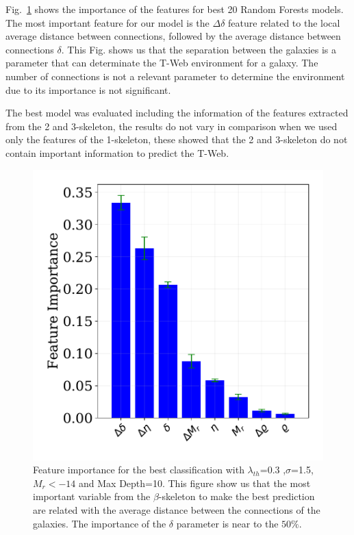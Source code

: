 \documentclass[usenatbib]{mnras}
\begin{document}
Fig.~\ref{fig:feature_importance} shows the importance of the features for best 20 Random Forests models. The most important feature for our model is the $\Delta \delta$ feature related to the local average distance between connections, followed by the average distance between connections $\delta$. This Fig. shows us that the separation between the galaxies is a parameter that can determinate the T-Web environment for a galaxy. The number of connections is not a relevant parameter to determine the environment due to its importance is not significant.

The best model was evaluated including the information of the features extracted from the 2 and 3-skeleton, the results do not vary in comparison when we used only the features of the 1-skeleton, these showed that the 2 and 3-skeleton do not contain important information to predict the T-Web.

\begin{figure}
\centering
    \includegraphics[scale=0.45]{Figs/p_features_importance_21.pdf}  
    \caption{Feature importance for the best classification with $\lambda_{th}$=0.3 ,$\sigma$=1.5, $M_{r}<-14$ and Max Depth=10. This figure show us that the most important variable from the $\beta$-skeleton to make the best prediction are related with the average distance between the connections of the galaxies. The importance of the $\delta$ parameter is near to the $50\%$.}
    \label{fig:feature_importance}     
\end{figure}
\end{document}
